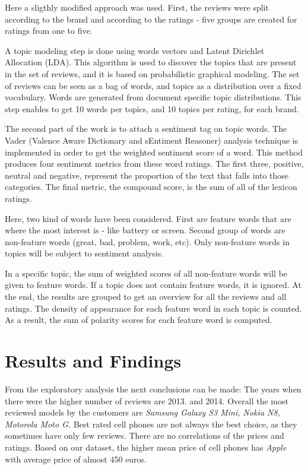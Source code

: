 \documentclass[11pt]{article}
\begin{document}
  Here a sligthly modified approach was used. 
  First, the reviews were split according to the brand and according to the ratings - five groups are created for ratings from one to five.\par
  A topic modeling step is done using words vectors and Latent Dirichlet Allocation (LDA). This algorithm is used to discover the topics that are present in the set of reviews, and it is based on probabilistic graphical modeling. The set of reviews can be seen as a bag of words, and topics as a distribution over a fixed vocabulary. Words are generated from document specific topic distributions. This step enables to get 10 words per topics, and 10 topics per rating, for each brand. \par
  The second part of the work is to attach a sentiment tag on topic words. The Vader (Valence Aware Dictionary and sEntiment Reasoner) analysis technique is implemented in order to get the weighted sentiment score of a word. This method produces four sentiment metrics from these word ratings. The first three, positive, neutral and negative, represent the proportion of the text that falls into those categories. The final metric, the compound score, is the sum of all of the lexicon ratings.\par
  Here, two kind of words have been considered. First are feature words that are where the most interest is - like battery or screen. Second group of words are non-feature words (great, bad, problem, work, etc). Only non-feature words in topics will be subject to sentiment analysis. \par
  In a specific topic, the sum of weighted scores of all non-feature words will be given to feature words. If a topic does not contain feature words, it is ignored.
  At the end, the results are grouped to get an overview for all the reviews and all ratings. The density of appearance for each feature word in each topic is counted. As a result, the sum of polarity scores for each feature word is computed.
  \par
  
  
  \section{Results and Findings}
  From the exploratory analysis the next conclusions can be made: The years when there were the higher number of reviews are 2013. and 2014. Overall the most reviewed models by the customers are \textit{Samsung Galaxy S3 Mini, Nokia N8, Motorola Moto G.} Best rated cell phones are not always the best choice, as they sometimes have only few reviews. There are no correlations of the prices and ratings. Based on our dataset, the higher mean price of cell phones has \textit{Apple} with average price of almost 450 euros. 
   \par
  
\end{document}
